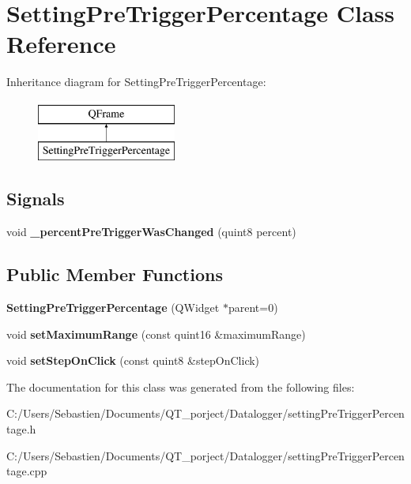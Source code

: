 \hypertarget{class_setting_pre_trigger_percentage}{}\section{Setting\+Pre\+Trigger\+Percentage Class Reference}
\label{class_setting_pre_trigger_percentage}
Inheritance diagram for Setting\+Pre\+Trigger\+Percentage\+:\begin{figure}[H]
\begin{center}
\leavevmode
\includegraphics[height=2.000000cm]{class_setting_pre_trigger_percentage}
\end{center}
\end{figure}
\subsection*{Signals}
\begin{DoxyCompactItemize}
\item 
\mbox{\label{class_setting_pre_trigger_percentage_a882297ce47834168efe05c42c55d47e3}} 
void {\bfseries \+\_\+percent\+Pre\+Trigger\+Was\+Changed} (quint8 percent)
\end{DoxyCompactItemize}
\subsection*{Public Member Functions}
\begin{DoxyCompactItemize}
\item 
\mbox{\label{class_setting_pre_trigger_percentage_a9b703fb0c666fca8f5061fb0a1589cfb}} 
{\bfseries Setting\+Pre\+Trigger\+Percentage} (Q\+Widget $\ast$parent=0)
\item 
\mbox{\label{class_setting_pre_trigger_percentage_a1f9116d87eebc926e9ce2f60c397df89}} 
void {\bfseries set\+Maximum\+Range} (const quint16 \&maximum\+Range)
\item 
\mbox{\label{class_setting_pre_trigger_percentage_a5e12b9aa0e289493cef29c1d4de52277}} 
void {\bfseries set\+Step\+On\+Click} (const quint8 \&step\+On\+Click)
\end{DoxyCompactItemize}


The documentation for this class was generated from the following files\+:\begin{DoxyCompactItemize}
\item 
C\+:/\+Users/\+Sebastien/\+Documents/\+Q\+T\+\_\+porject/\+Datalogger/setting\+Pre\+Trigger\+Percentage.\+h\item 
C\+:/\+Users/\+Sebastien/\+Documents/\+Q\+T\+\_\+porject/\+Datalogger/setting\+Pre\+Trigger\+Percentage.\+cpp\end{DoxyCompactItemize}

